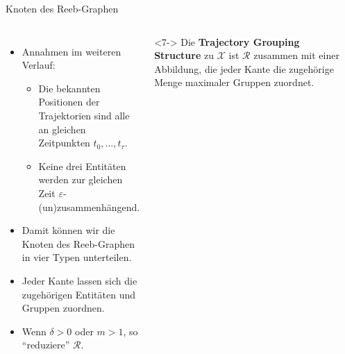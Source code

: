 \documentclass[
wide,
10pt,
xcolor={x11names,svgnames},
hyperref={pdfauthor={Jannes Bantje},colorlinks,urlcolor=maincolor,hidelinks=false,linkcolor=maincolor},
pantone312, 	%
euler-digits,
]{beamer}
\newcommand{\bet}[1]{\textbf{\color{maincolor}#1}}
\theoremstyle{definition}
\begin{document}
\begin{frame}{Knoten des Reeb-Graphen}
    \begin{columns}
        \begin{itemize}[<+->]
            \item Annahmen im weiteren Verlauf:
            \begin{itemize}
                \item Die bekannten Positionen der Trajektorien sind alle an gleichen Zeitpunkten $t_0, \ldots ,t_\tau$.
            	\item Keine drei Entitäten werden zur gleichen Zeit $\varepsilon$-(un)zusammenhängend.
            \end{itemize}
            \item Damit können wir die Knoten des Reeb-Graphen in vier Typen unterteilen.
            \item Jeder Kante lassen sich die zugehörigen Entitäten und Gruppen zuordnen.
            \item Wenn $\delta>0$ oder $m>1$, so \enquote{reduziere} $\mathcal{R}$.
        \end{itemize}
        \begin{definition}<7->
            Die \bet{Trajectory Grouping Structure} zu $\mathcal{X}$ ist $\mathcal{R}$ zusammen mit einer Abbildung, die jeder Kante die zugehörige Menge maximaler Gruppen zuordnet.
        \end{definition}
        \\[4em]
    \end{columns}
\end{frame}
\end{document}
